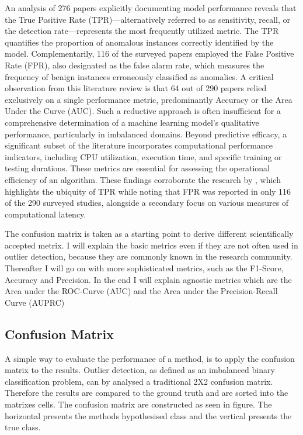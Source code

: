 An analysis of 276 papers explicitly documenting model performance reveals that the True Positive Rate (TPR)—alternatively referred to as sensitivity, recall, or the detection rate—represents the most frequently utilized metric. 
The TPR quantifies the proportion of anomalous instances correctly identified by the model. 
Complementarily, 116 of the surveyed papers employed the False Positive Rate (FPR), also designated as the false alarm rate, which measures the frequency of benign instances erroneously classified as anomalies.
A critical observation from this literature review is that 64 out of 290 papers relied exclusively on a single performance metric, predominantly Accuracy or the Area Under the Curve (AUC). 
Such a reductive approach is often insufficient for a comprehensive determination of a machine learning model's qualitative performance, particularly in imbalanced domains. 
Beyond predictive efficacy, a significant subset of the literature incorporates computational performance indicators, including CPU utilization, execution time, and specific training or testing durations. 
These metrics are essential for assessing the operational efficiency of an algorithm. 
These findings corroborate the research by \citep[postfix]{nassif2021}, which highlights the ubiquity of TPR while noting that FPR was reported in only 116 of the 290 surveyed studies, alongside a secondary focus on various measures of computational latency.


The confusion matrix is taken as a starting point to derive different scientifically accepted metrix.
I will explain the basic metrics even if they are not often used in outlier detection, because they are commonly known in the research community. 
Thereafter I will go on with more sophisticated metrics, such as the F1-Score, Accuracy and Precision.
In the end I will explain agnostic metrics which are the Area under the ROC-Curve (AUC) and the Area under the Precision-Recall Curve (AUPRC)




\subsection*{Confusion Matrix}
A simple way to evaluate the performance of a method, is to apply the confusion matrix to the results. 
Outlier detection, as defined as an imbalanced binary classification problem, can by analysed a traditional 2X2 confusion matrix.
Therefore the results are compared to the ground truth and are sorted into the matrixes cells.
The confusion matrix are constructed as seen in figure.
The horizontal presents the methods hypothesised class and the vertical presents the true class.


